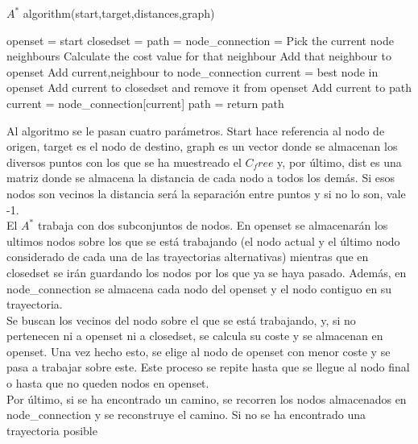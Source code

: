 \begin{algorithm}
\caption{$A^*$ algorithm(start,target,distances,graph)}\label{A_algorithm}
\begin{algorithmic}[1]
\State openset = start
\State closedset = {}
\State path = {}
\State node_connection = {}
 \State Pick the current node neighbours
 \State Calculate the cost value for that neighbour
 \State Add that neighbour to openset
 \State Add current,neighbour to node_connection
\EndFor
\State current = best node in openset
\State Add current to closedset and remove it from openset
\EndWhile
{}
\State Add current to path
\State current = node_connection[current]
\EndWhile
\Else
\State path = {}
\EndIf
\State return path
\end{algorithmic}
\end{algorithm}  

Al algoritmo se le pasan cuatro parámetros. Start hace referencia al nodo de origen, target es el nodo de destino, graph es un vector donde se almacenan los diversos puntos con los que se ha muestreado el $C_free$ y, por último, dist es una matriz donde se almacena la distancia de cada nodo a todos los demás. Si esos nodos son vecinos la distancia será la separación entre puntos y si no lo son, vale -1.\\

El $A^*$ trabaja con dos subconjuntos de nodos. En openset se almacenarán los ultimos nodos sobre los que se está trabajando (el nodo actual y el último nodo considerado de cada una de las trayectorias alternativas) mientras que en closedset se irán guardando los nodos por los que ya se haya pasado. Además, en node_connection se almacena cada nodo del openset y el nodo contiguo en su trayectoria.\\

Se buscan los vecinos del nodo sobre el que se está trabajando, y, si no pertenecen ni a openset ni a closedset, se calcula su coste y se almacenan en openset. Una vez hecho esto, se elige al nodo de openset con menor coste y se pasa a trabajar sobre este. Este proceso se repite hasta que se llegue al nodo final o hasta que no queden nodos en openset.\\

Por último, si se ha encontrado un camino, se recorren los nodos almacenados en node_connection y se reconstruye el camino. Si no se ha encontrado una trayectoria posible